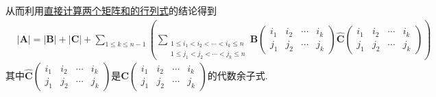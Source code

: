 \documentclass[../../main.tex]{subfiles}
\begin{document}
\begin{solution}
\begin{enumerate}[(1)]
从而利用\hyperref[proposition:直接计算两个矩阵和的行列式]{直接计算两个矩阵和的行列式}的结论得到
\begin{align}\label{eq(行列式):1.5式}
&|\boldsymbol{A}| = |\boldsymbol{B}| + |\boldsymbol{C}| + \sum_{1\leqslant k\leqslant n - 1}\left(\sum_{\begin{array}{c}
1\leqslant i_1 < i_2 < \cdots < i_k\leqslant n\\
1\leqslant j_1 < j_2 < \cdots < j_k\leqslant n
\end{array}}\boldsymbol{B}\left(\begin{matrix}
i_1 & i_2 & \cdots & i_k\\
j_1 & j_2 & \cdots & j_k
\end{matrix}\right)\widehat{\boldsymbol{C}}\left(\begin{matrix}
i_1 & i_2 & \cdots & i_k\\
j_1 & j_2 & \cdots & j_k
\end{matrix}\right)\right)
\end{align}
其中\(\widehat{\boldsymbol{C}}\left(\begin{matrix}
i_1 & i_2 & \cdots & i_k\\
j_1 & j_2 & \cdots & j_k
\end{matrix}\right)\)是\(\boldsymbol{C}\left(\begin{matrix}
i_1 & i_2 & \cdots & i_k\\
j_1 & j_2 & \cdots & j_k
\end{matrix}\right)\)的代数余子式.


\end{enumerate}
\end{solution}
\end{document}
